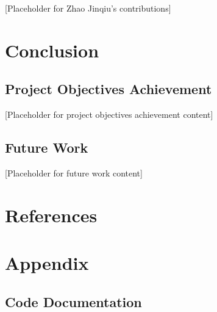 \documentclass[12pt,a4paper]{article}
\begin{document}

[Placeholder for Zhao Jinqiu's contributions]

\section{Conclusion}


\subsection{Project Objectives Achievement}


[Placeholder for project objectives achievement content]

\subsection{Future Work}


[Placeholder for future work content]

\section{References}

\printbibliography

\section{Appendix}


\subsection{Code Documentation}

\end{document}
